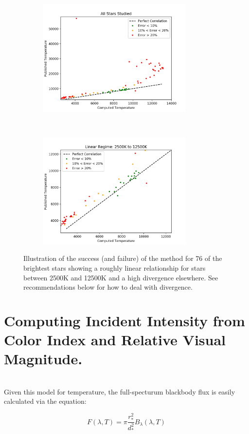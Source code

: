 \documentclass[]{DINOReportMemo}
\begin{document}
\begin{figure}[t!]
    \centering
    \begin{subfigure}
        \centering
        \includegraphics[height=2.3in]{all_stars_scatter}
    \end{subfigure}%
    ~ 
    \begin{subfigure}
        \centering
        \includegraphics[height=2.3in]{linear_regime_scatter}
    \end{subfigure}
    \caption{Illustration of the success (and failure) of the method for 76 of the brightest stars showing a roughly linear relationship for stars between 2500K and 12500K and a high divergence elsewhere. See recommendations below for how to deal with divergence.}
    \label{T_scatter}
\end{figure}



\section{Computing Incident  Intensity from Color Index and Relative Visual Magnitude.} \\
Given this model for temperature, the full-specturum blackbody flux is easily calculated via the equation:

\begin{equation}\label{full_flux_expression}
    F(\lambda,T) = \pi\frac{r^2_*}{d^2_*}B_\lambda(\lambda,T)
\end{equation}
\end{document}
